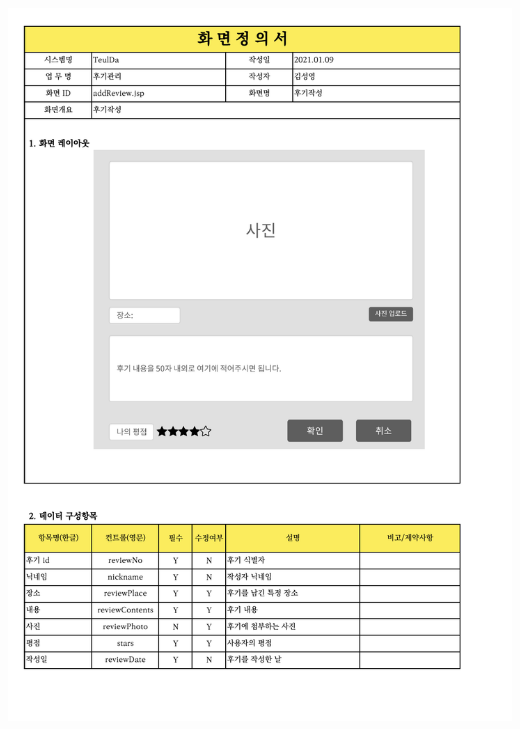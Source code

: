 {{{{{{{{{{{{{{{{{{{{{{{{{{\includegraphics[width=20cm]{./Figure/Analysis/Display/review/review_01.pdf} \\
}}}}}}}}}}}}}}}}}}}}}}}}}}
